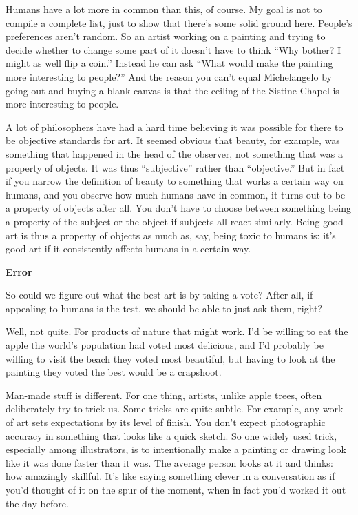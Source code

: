 Humans have a lot more in common than this, of course. My goal is not to
compile a complete list, just to show that there's some solid ground
here. People's preferences aren't random. So an artist working on a
painting and trying to decide whether to change some part of it doesn't
have to think ``Why bother? I might as well flip a coin.'' Instead he
can ask ``What would make the painting more interesting to people?'' And
the reason you can't equal Michelangelo by going out and buying a blank
canvas is that the ceiling of the Sistine Chapel is more interesting to
people.

A lot of philosophers have had a hard time believing it was possible for
there to be objective standards for art. It seemed obvious that beauty,
for example, was something that happened in the head of the observer,
not something that was a property of objects. It was thus ``subjective''
rather than ``objective.'' But in fact if you narrow the definition of
beauty to something that works a certain way on humans, and you observe
how much humans have in common, it turns out to be a property of objects
after all. You don't have to choose between something being a property
of the subject or the object if subjects all react similarly. Being good
art is thus a property of objects as much as, say, being toxic to humans
is: it's good art if it consistently affects humans in a certain way.

\textbf{Error}

So could we figure out what the best art is by taking a vote? After all,
if appealing to humans is the test, we should be able to just ask them,
right?

Well, not quite. For products of nature that might work. I'd be willing
to eat the apple the world's population had voted most delicious, and
I'd probably be willing to visit the beach they voted most beautiful,
but having to look at the painting they voted the best would be a
crapshoot.

Man-made stuff is different. For one thing, artists, unlike apple trees,
often deliberately try to trick us. Some tricks are quite subtle. For
example, any work of art sets expectations by its level of finish. You
don't expect photographic accuracy in something that looks like a quick
sketch. So one widely used trick, especially among illustrators, is to
intentionally make a painting or drawing look like it was done faster
than it was. The average person looks at it and thinks: how amazingly
skillful. It's like saying something clever in a conversation as if
you'd thought of it on the spur of the moment, when in fact you'd worked
it out the day before.

